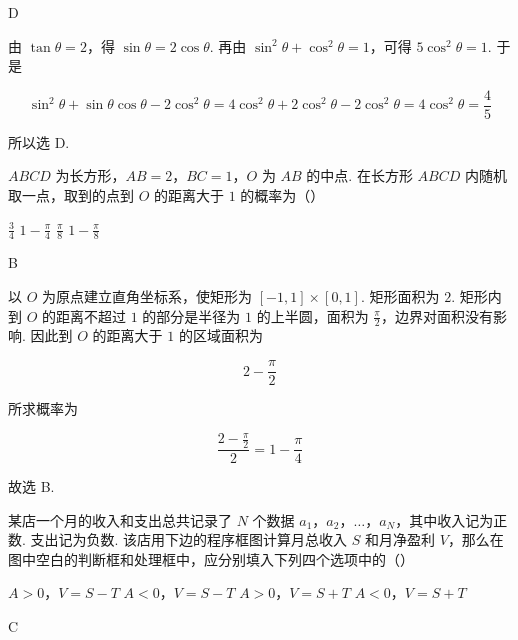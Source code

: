 \begin{answer}
    D
\end{answer}

\begin{solution}
由 \(\tan\theta=2\)，得 \(\sin\theta=2\cos\theta\). 再由
\(\sin^2\theta+\cos^2\theta=1\)，可得 \(5\cos^2\theta=1\). 于是

\[
\sin^2\theta+\sin\theta\cos\theta-2\cos^2\theta
 =4\cos^2\theta+2\cos^2\theta-2\cos^2\theta
 =4\cos^2\theta=\frac45
\]

所以选 D.
\end{solution}

\begin{problem}
\(ABCD\) 为长方形，\(AB = 2\)，\(BC = 1\)，\(O\) 为 \(AB\) 的中点. 在长方形 \(ABCD\) 内随机取一点，取到的点到 \(O\) 的距离大于 \(1\) 的概率为（\quad）

\choices
    {\( \frac{3}{4} \)}
    {\(1 - \frac{\pi}{4}\)}
    {\(\frac{\pi}{8}\)}
    {\(1 - \frac{\pi}{8}\)}
\end{problem}

\begin{answer}
    B
\end{answer}

\begin{solution}
以 \(O\) 为原点建立直角坐标系，使矩形为 \([-1,1]\times[0,1]\). 矩形面积为 \(2\). 矩形内到 \(O\) 的距离不超过 \(1\) 的部分是半径为 \(1\) 的上半圆，面积为 \(\frac\pi2\)，边界对面积没有影响. 因此到 \(O\) 的距离大于 \(1\) 的区域面积为

\[
2-\frac\pi2
\]

所求概率为

\[
\frac{2-\frac\pi2}{2}=1-\frac\pi4
\]

故选 B.
\end{solution}

\begin{problem}
某店一个月的收入和支出总共记录了 \(N\) 个数据 \(a_1\)，\(a_2\)，\(\dots\)，\(a_N\)，其中收入记为正数. 支出记为负数. 该店用下边的程序框图计算月总收入 \(S\) 和月净盈利 \(V\)，那么在图中空白的判断框和处理框中，应分别填入下列四个选项中的（\quad）


\choices
    {\(A > 0\)，\(V = S - T\)}
    {\(A < 0\)，\(V = S - T\)}
    {\(A > 0\)，\(V = S + T\)}
    {\(A < 0\)，\(V = S + T\)}
\end{problem}

\begin{answer}
    C
\end{answer}

